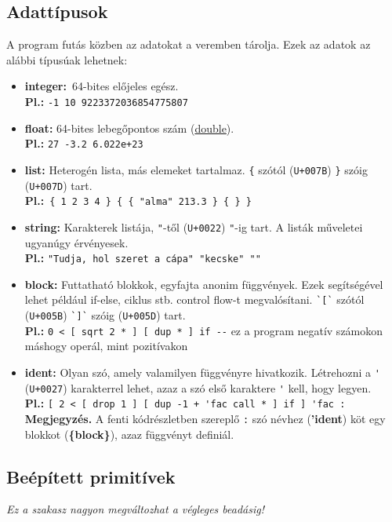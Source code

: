 \documentclass[a4paper]{article}
\begin{document}
\subsection*{Adattípusok}
A program futás közben az adatokat a veremben tárolja. Ezek az adatok az alábbi típusúak lehetnek:
\begin{itemize}
\item {\bf integer:} 64-bites előjeles egész.\\
	{\bf Pl.:} \verb|-1 10 9223372036854775807|
\item {\bf float:} 64-bites lebegőpontos szám (\href{https://en.wikipedia.org/wiki/IEEE_754}{double}).\\
	{\bf Pl.:} \verb|27 -3.2 6.022e+23|
\item {\bf list:} Heterogén lista, más elemeket tartalmaz. \verb|{| szótól (\verb|U+007B|) \verb|}| szóig (\verb|U+007D|) tart.\\
	{\bf Pl.:} \verb|{ 1 2 3 4 } { { "alma" 213.3 } { } }|
\item {\bf string:} Karakterek listája, \verb|"|-től (\verb|U+0022|) \verb|"|-ig tart. A listák műveletei ugyanúgy érvényesek.\\
	{\bf Pl.:} \verb|"Tudja, hol szeret a cápa" "kecske" ""|
\item {\bf block:} Futtatható blokkok, egyfajta anonim függvények. Ezek segítségével lehet például if-else, ciklus stb. control flow-t megvalósítani. \verb|`[`| szótól (\verb|U+005B|) \verb|`]`| szóig (\verb|U+005D|) tart.\\
	{\bf Pl.:} \verb|0 < [ sqrt 2 * ] [ dup * ] if --| ez a program negatív számokon máshogy operál, mint pozitívakon
\item {\bf ident:} Olyan szó, amely valamilyen függvényre hivatkozik. Létrehozni a \verb|'| (\verb|U+0027|) karakterrel lehet, azaz a szó első karaktere \verb|'| kell, hogy legyen. \\
	{\bf Pl.:} \verb|[ 2 < [ drop 1 ] [ dup -1 + 'fac call * ] if ] 'fac :|\\
{\bf Megjegyzés. } A fenti kódrészletben szereplő \verb|:| szó névhez ({\bf 'ident}) köt egy blokkot ({\bf \{block\}}), azaz függvényt definiál. 
\end{itemize}
\pagebreak
\subsection*{Beépített primitívek}
\emph{Ez a szakasz nagyon megváltozhat a végleges beadásig!} \\
\end{document}
